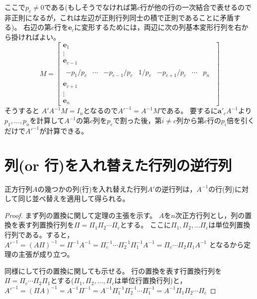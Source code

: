         ここで$p_c\neq 0$である(もしそうでなければ第$c$行が他の行の一次結合で表せるので非正則になるが，これは左辺が正則行列同士の積で正則であることに矛盾する)。
        右辺の第$c$行を$\bm{e}_c$に変形するためには，両辺に次の列基本変形行列を右から掛ければよい。
        \[
            M =
            \begin{bmatrix}
                \bm{e}_1 \\
                \vdots \\
                \bm{e}_{c-1} \\
                \begin{matrix}
                    -p_1/p_c & \cdots & -p_{c-1}/p_c & 1/p_c & -p_{c+1}/p_c & \cdots & p_n
                \end{matrix} \\
                \bm{e}_{c+1} \\
                \vdots \\
                \bm{e}_n
            \end{bmatrix}
        \]
        そうすると
        $A'A^{-1}M = I_n$となるので$A'^{-1} = A^{-1}M$である。
        要するに$\bm{a}'_c A^{-1}$より$p_1,\dotsc,p_n$を計算して$A^{-1}$の第$c$列を$p_c$で割った後，第$i\neq c$列から第$c$行の$p_i$倍を引くだけで$A'^{-1}$が計算できる。
    \section{列(or 行)を入れ替えた行列の逆行列}
        \begin{shadebox}
            正方行列$A$の幾つかの列(行)を入れ替えた行列$A'$の逆行列は，$A^{-1}$の行(列)に対して同じ並べ替えを適用して得られる。
        \end{shadebox}
        \begin{proof}
            \quad\par
            まず列の置換に関して定理の主張を示す。
            $A$を$n$次正方行列とし，列の置換を表す列置換行列を$\Pi = \Pi_1\Pi_2\dotsm\Pi_c$とする。
            ここに$\Pi_1, \Pi_2, \dotsc\Pi_c$は単位列置換行列である。すると，
            $A'^{-1} = (A\Pi)^{-1} = \Pi^{-1}A^{-1} = \Pi_c^{-1}\dotsm\Pi_2^{-1}\Pi_1^{-1}A^{-1} = \Pi_c\dotsm\Pi_2\Pi_1A^{-1}$
            となるから定理の主張が成り立つ。
            \par
            同様にして行の置換に関しても示せる。
            行の置換を表す行置換行列を$\Pi = \Pi_c\dotsm\Pi_2\Pi_1$とする($\Pi_1, \Pi_2, \dotsc, \Pi_c$は単位行置換行列)と，
            $A'^{-1} = (\Pi A)^{-1} = A^{-1}\Pi^{-1} = A^{-1}\Pi_1^{-1}\Pi_2^{-1}\dotsm\Pi_1^{-1} = A^{-1}\Pi_1\Pi_2\dotsm\Pi_c$
        \end{proof}

